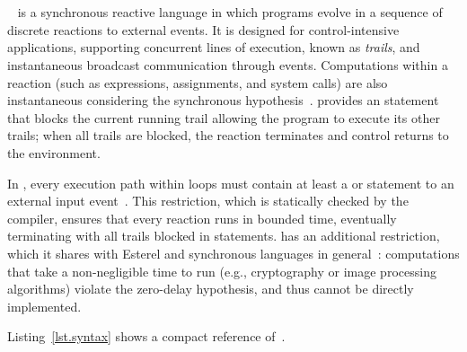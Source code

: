 \section{\CEU}
\label{sec.ceu}

\CEU~\cite{ceu.sensys13,ceu.tecs17} is a synchronous reactive language in which
programs evolve in a sequence of discrete reactions to external events.
%
It is designed for control-intensive applications, supporting concurrent lines
of execution, known as \emph{trails}, and instantaneous broadcast communication
through events.
%
Computations within a reaction (such as expressions, assignments, and
system calls) are also instantaneous considering the synchronous
hypothesis~\cite{rp.hypothesis}.
%
%
\CEU provides an  statement that blocks the current running trail
allowing the program to execute its other trails; when all trails are blocked,
the reaction terminates and control returns to the environment.

In \CEU, every execution path within loops must contain at least a 
or  statement to an external input
event~\cite{ceu.sensys13,esterel.primer}.
%
This restriction, which is statically checked by the compiler, ensures that
every reaction runs in bounded time, eventually terminating with all trails
blocked in  statements.
%
\CEU has an additional restriction, which it shares with Esterel and
synchronous languages in general~\cite{esterel.preemption}: computations that
take a non-negligible time to run (e.g., cryptography or image processing
algorithms) violate the zero-delay hypothesis, and thus cannot be directly
implemented.

Listing~\ref{lst.syntax} shows a compact reference of~\CEU.

